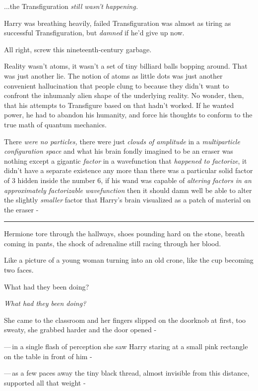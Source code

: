 ...the Transfiguration \emph{still wasn't happening.}

Harry was breathing heavily, failed Transfiguration was almost as tiring as successful Transfiguration, but \emph{damned} if he'd give up now.

All right, screw this nineteenth-century garbage.

Reality wasn't atoms, it wasn't a set of tiny billiard balls bopping around. That was just another lie. The notion of atoms as little dots was just another convenient hallucination that people clung to because they didn't want to confront the inhumanly alien shape of the underlying reality. No wonder, then, that his attempts to Transfigure based on that hadn't worked. If he wanted power, he had to abandon his humanity, and force his thoughts to conform to the true math of quantum mechanics.

There \emph{were no particles,} there were just \emph{clouds of amplitude} in a \emph{multiparticle configuration space} and what his brain fondly imagined to be an eraser was nothing except a gigantic \emph{factor} in a wavefunction that \emph{happened to factorize}, it didn't have a separate existence any more than there was a particular solid factor of 3 hidden inside the number 6, if his wand was capable of \emph{altering factors in an approximately factorizable wavefunction} then it should damn well be able to alter the slightly \emph{smaller} factor that Harry's brain visualized as a patch of material on the eraser -

\begin{center}\rule{3in}{0.4pt}\end{center}

Hermione tore through the hallways, shoes pounding hard on the stone, breath coming in pants, the shock of adrenaline still racing through her blood.

Like a picture of a young woman turning into an old crone, like the cup becoming two faces.

What had they been doing?

\emph{What had they been doing?}

She came to the classroom and her fingers slipped on the doorknob at first, too sweaty, she grabbed harder and the door opened -

---\,in a single flash of perception she saw Harry staring at a small pink rectangle on the table in front of him -

---\,as a few paces away the tiny black thread, almost invisible from this distance, supported all that weight -

